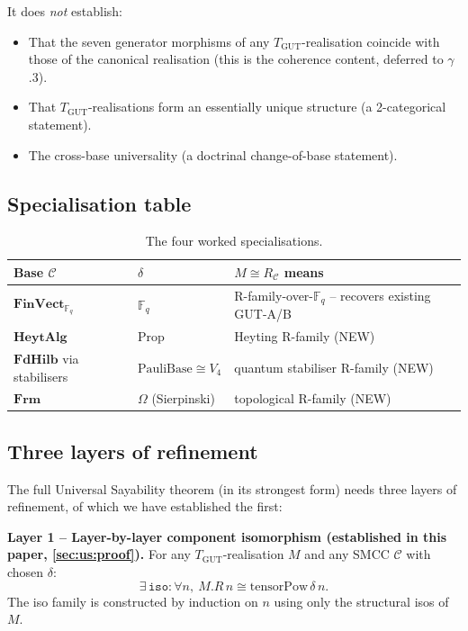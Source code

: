 \documentclass[11pt,a4paper]{article}
\theoremstyle{plain}
\theoremstyle{definition}
\theoremstyle{remark}
\newcommand{\F}{\mathbb{F}}
\newcommand{\cat}[1]{\mathbf{#1}}
\newcommand{\HeytAlg}{\cat{HeytAlg}}
\newcommand{\FdHilb}{\cat{FdHilb}}
\newcommand{\Frm}{\cat{Frm}}
\newcommand{\FinVect}{\cat{FinVect}}
\newcommand{\TGUT}{T_{\mathrm{GUT}}}
\newcommand{\PauliBase}{\mathrm{PauliBase}}
\newcommand{\tensorPow}{\mathrm{tensorPow}}
\newcommand{\smcc}{SMCC}
\begin{document}
It does \emph{not} establish:
\begin{itemize}[leftmargin=*]
\item That the seven generator morphisms of any $\TGUT$-realisation coincide with those of the canonical realisation (this is the coherence content, deferred to $\gamma$.3).
\item That $\TGUT$-realisations form an essentially unique structure (a 2-categorical statement).
\item The cross-base universality (a doctrinal change-of-base statement).
\end{itemize}

\subsection{Specialisation table}\label{sec:us:spec}

\begin{table}[h!]
\centering
\small
\begin{tabular}{lll}
\toprule
Base $\mathcal{C}$ & $\delta$ & $M \cong R_{\mathcal{C}}$ means \\
\midrule
$\FinVect_{\F_q}$ & $\F_q$ & R-family-over-$\F_q$ -- recovers existing GUT-A/B \\
$\HeytAlg$ & $\mathrm{Prop}$ & Heyting R-family (NEW) \\
$\FdHilb$ via stabilisers & $\PauliBase \cong V_4$ & quantum stabiliser R-family (NEW) \\
$\Frm$ & $\Omega$ (Sierpinski) & topological R-family (NEW) \\
\bottomrule
\end{tabular}
\caption{The four worked specialisations.}\label{tab:four-spec}
\end{table}

\subsection{Three layers of refinement}\label{sec:us:layers}

The full Universal Sayability theorem (in its strongest form) needs three layers of refinement, of which we have established the first:

\textbf{Layer 1 -- Layer-by-layer component isomorphism (established in this paper, \cref{sec:us:proof}).} For any $\TGUT$-realisation $M$ and any \smcc{} $\mathcal{C}$ with chosen $\delta$:
\[
\exists\, \mathtt{iso} : \forall n,\ M.R\,n \cong \tensorPow\,\delta\,n.
\]
The iso family is constructed by induction on $n$ using only the structural isos of $M$.
\end{document}
